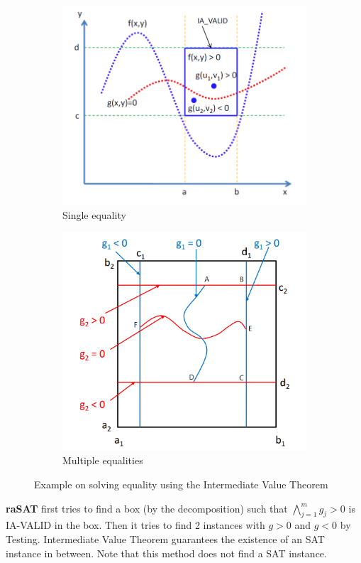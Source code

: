\documentclass[runningheads,a4paper,oribibl]{llncs}
\begin{document}
\begin{figure}
\centering
\begin{subfigure}{0.49\textwidth}
\includegraphics[width=1.\linewidth]{singleEquation.png} 
\caption{Single equality}
\label{fig:single-equation}
\end{subfigure}
\begin{subfigure}{0.49\textwidth}
\includegraphics[width=1.\linewidth]{multipleEquations.png}  
\caption{Multiple equalities}
\label{fig:multiple-equations}  
\end{subfigure}
\caption{Example on solving equality using the Intermediate Value Theorem}
\end{figure}
    {\bf raSAT} first tries to find a box (by the decomposition) such that
    $\bigwedge \limits_{j=1}^m g_j > 0$ is IA-VALID in the box.
    Then it tries to find 2 instances with $g > 0$ and $g < 0$ by Testing. 
    Intermediate Value Theorem guarantees the existence of an SAT instance
    in between. Note that this method does not find a SAT instance. 
\end{document}
